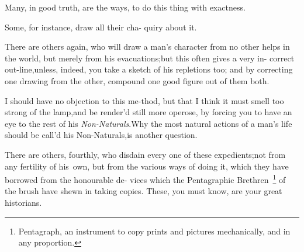 \documentclass{article}
\begin{document}
Many, in good truth, are the ways, 
to do this thing with exactness.

Some, for instance, draw all their cha-
quiry about it.

There are others again, who will draw a man’s character
from no other helps in the world, but merely from his
evacuations;\tsk but this often gives a very in-
correct out-line,\tsk unless, indeed, you\break
take a sketch of his repletions too; and\break
by correcting one drawing from the\break
other, compound one good figure out of\break
them both.

I should have no objection to this me-\break thod, but that I think it
must smell too strong of the lamp,\tsk and be render’d
still more operose, by forcing you to have an eye to the rest of
his \textit{Non-Naturals}.\tsk\break Why the most natural actions of a
man’s life should be call’d his Non-Naturals,\tsk\break is
another question.

There are others, fourthly, who disdain every one of these expedients;\tsk not from
any fertility of his\sic\ own, but from the various ways of doing it, which they have
borrowed from the honourable de- vices which the Pentagraphic
Brethren~\footnote{\enspace Pentagraph, \vrule width 0pt height 18pt
an instrument to copy prints and pictures
mechanically, and in any proportion.} of the brush have shewn in
taking co\-pies.\tsk 
These, you must know, are your great historians.

\noindent
{}
\end{document}
